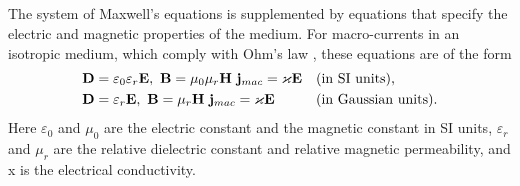 \subsection{}\label{27.4.4} The system of Maxwell's equations is supplemented by equations that specify the electric and magnetic properties of the medium. For macro-currents in an isotropic medium, which comply with Ohm's law , these equations are of the form
\begin{align*}%
\vb{D} & = \varepsilon_{0}\varepsilon_{r} \vb{E}, \,\, \vb{B} = \mu_{0}\mu_{r} \vb{H} \,\, \vb{j}_{mac} = \varkappa \vb{E} && \text{(in SI units),} \\
\vb{D} & = \varepsilon_{r} \vb{E}, \,\, \vb{B} = \mu_{r} \vb{H} \,\, \vb{j}_{mac} = \varkappa \vb{E} && \text{(in Gaussian units).}
\end{align*}
Here $\varepsilon_{0}$ and $\mu_{0}$ are the electric constant  and the magnetic constant  in SI units, $\varepsilon_{r}$ and $\mu_{r}$ are the relative dielectric constant and relative magnetic permeability, and x is the electrical conductivity.

